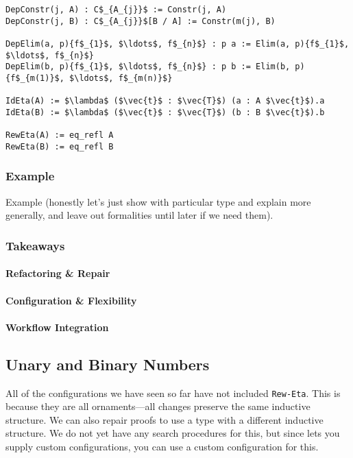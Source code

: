 \begin{lstlisting}
DepConstr(j, A) : C$_{A_{j}}$ := Constr(j, A) 
DepConstr(j, B) : C$_{A_{j}}$[B / A] := Constr(m(j), B)

DepElim(a, p){f$_{1}$, $\ldots$, f$_{n}$} : p a := Elim(a, p){f$_{1}$, $\ldots$, f$_{n}$}
DepElim(b, p){f$_{1}$, $\ldots$, f$_{n}$} : p b := Elim(b, p){f$_{m(1)}$, $\ldots$, f$_{m(n)}$}

IdEta(A) := $\lambda$ ($\vec{t}$ : $\vec{T}$) (a : A $\vec{t}$).a
IdEta(B) := $\lambda$ ($\vec{t}$ : $\vec{T}$) (b : B $\vec{t}$).b

RewEta(A) := eq_refl A
RewEta(B) := eq_refl B
\end{lstlisting}

\subsubsection{Example}

Example (honestly let's just show with particular type and explain more generally, and leave out formalities until later if we need them).

\subsubsection{Takeaways}

\paragraph{Refactoring \& Repair}

\paragraph{Configuration \& Flexibility}

\paragraph{Workflow Integration}

\subsection{Unary and Binary Numbers}
\label{sec:bin}

All of the configurations we have seen so far have not included \lstinline{Rew-Eta}.
This is because they are all ornaments---all changes preserve the same inductive structure.
We can also repair proofs to use a type with a different inductive structure.
We do not yet have any search procedures for this, but since \toolname lets you supply
custom configurations, you can use a custom configuration for this.

